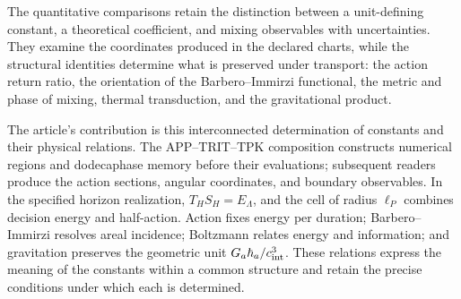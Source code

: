 

The quantitative comparisons retain the distinction between a
unit-defining constant, a theoretical coefficient, and mixing
observables with uncertainties. They examine the coordinates produced
in the declared charts, while the structural identities determine
what is preserved under transport: the action return ratio,
the orientation of the Barbero--Immirzi functional, the metric and
phase of mixing, thermal transduction, and the gravitational product.

The article's contribution is this interconnected determination of
constants and their physical relations. The APP--TRIT--TPK composition
constructs numerical regions and dodecaphase memory before their
evaluations; subsequent readers produce the action sections, angular
coordinates, and boundary observables. In the specified horizon
realization, \(T_HS_H=E_\Lambda\), and the cell of radius
\(\ell_P\) combines decision energy and half-action. Action fixes
energy per duration; Barbero--Immirzi resolves areal incidence;
Boltzmann relates energy and information; and gravitation preserves
the geometric unit \(G_a\hbar_a/c_{\rm int}^3\).
These relations express the meaning of the constants within a common
structure and retain the precise conditions under which each is
determined.

